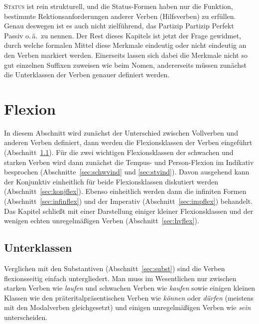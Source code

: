 \begin{exe}
\end{exe}

\textsc{Status} ist rein strukturell, und die Status-Formen haben nur die Funktion, bestimmte Rektionsanforderungen anderer Verben (\zB Hilfsverben) zu erfüllen.
Genau deswegen ist es auch nicht zielführend, das Partizip Partizip Perfekt Passiv o.\,ä.\ zu nennen.
Der Rest dieses Kapitels ist jetzt der Frage gewidmet, durch welche formalen Mittel diese Merkmale eindeutig oder nicht eindeutig an den Verben markiert werden.
Einerseits lassen sich dabei die Merkmale nicht so gut einzelnen Suffixen zuweisen wie beim Nomen, andererseits müssen zunächst die Unterklassen der Verben genauer definiert werden.

\section{Flexion}

\label{sec:vvflex}

In diesem Abschnitt wird zunächst der Unterschied zwischen Vollverben und anderen Verben definiert, dann werden die Flexionsklassen der Verben eingeführt (Abschnitt~\ref{sec:vunterklass}).
Für die zwei wichtigen Flexionsklassen der schwachen und starken Verben wird dann zunächst die Tempus- und Person-Flexion im Indikativ besprochen (Abschnitte~\ref{sec:schwvind} und \ref{sec:stvind}).
Davon ausgehend kann der Konjunktiv einheitlich für beide Flexionsklassen diskutiert werden (Abschnitt~\ref{sec:konjflex}).
Ebenso einheitlich werden dann die infiniten Formen (Abschnitt~\ref{sec:infinflex}) und der Imperativ (Abschnitt~\ref{sec:impflex}) behandelt.
Das Kapitel schließt mit einer Darstellung einiger kleiner Flexionsklassen und der wenigen echten unregelmäßigen Verben (Abschnitt~\ref{sec:hvflex}).

\subsection{Unterklassen}

\label{sec:vunterklass}


Verglichen mit den Substantiven (Abschnitt~\ref{sec:subst}) sind die Verben flexionsseitig einfach untergliedert.
Man muss im Wesentlichen nur zwischen starken Verben wie \textit{laufen} und schwachen Verben wie \textit{kaufen} sowie einigen kleinen Klassen wie den präteritalpräsentischen Verben wie \textit{können} oder \textit{dürfen} (meistens mit den Modalverben gleichgesetzt) und einigen unregelmäßigen Verben wie \textit{sein} unterscheiden.

